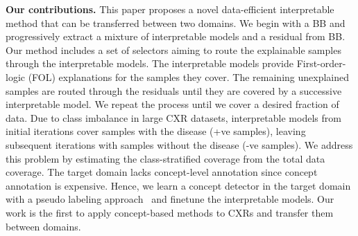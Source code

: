 \textbf{Our contributions.}
This paper proposes a novel data-efficient interpretable method that can be transferred between two domains. We begin with a BB and progressively extract a mixture of interpretable models and a residual from BB. Our method includes a set of selectors aiming to route the explainable samples through the interpretable models. The interpretable models provide First-order-logic (FOL) explanations for the samples they cover. The remaining unexplained samples are routed through the residuals until they are covered by a successive interpretable model. We repeat the process until we cover a desired fraction of data. Due to class imbalance in large CXR datasets, interpretable models from initial iterations cover samples with the disease (+ve samples), leaving subsequent iterations with samples without the disease (-ve samples). We address this problem by estimating the class-stratified coverage from the total data coverage. The target domain lacks concept-level annotation since concept annotation is expensive. Hence, we learn a concept detector in the target domain with a pseudo labeling approach~\cite{lee2013pseudo} and finetune the interpretable models. Our work is the first to apply concept-based methods to CXRs and transfer them between domains. 

 
